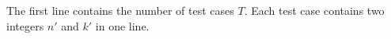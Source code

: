 The first line contains the number of test cases $T$. Each test case contains two integers $n'$ and $k'$ in one line.